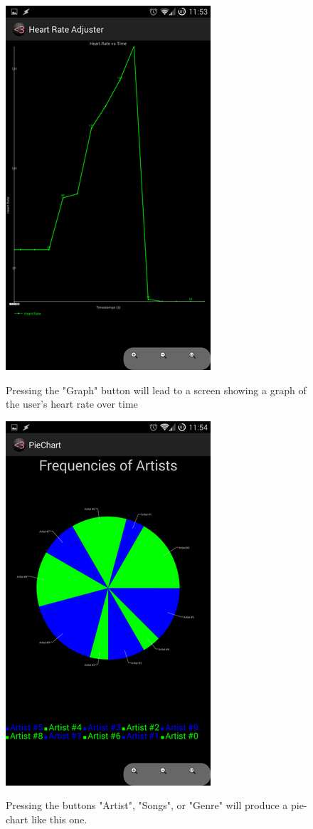 \documentclass[letterpaper,english, 12pt]{scrreprt}
\begin{document}
\begin{figure}[H]
	\centering
	\includegraphics{img/mobile_ui/4.png}\\
	\caption{Pressing the "Graph" button will lead to a screen showing a graph of the user's heart rate over time}
\end{figure}

\begin{figure}[H]
	\centering
	\includegraphics{img/mobile_ui/5.png}\\
	\caption{Pressing the buttons "Artist", "Songs", or "Genre" will produce a pie-chart like this one.}
\end{figure}
\end{document}
